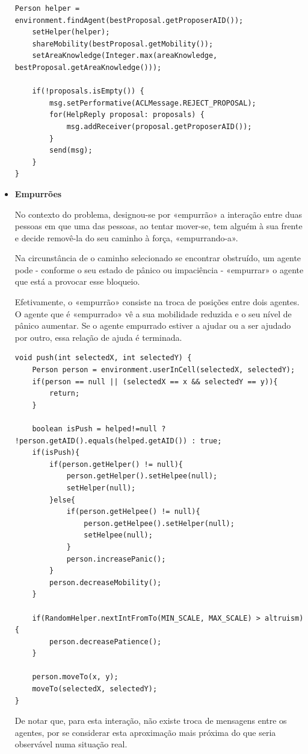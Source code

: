 \documentclass[12pt]{article}
\begin{document}
\begin{titlepage}
\begin{itemize}
\begin{lstlisting}[caption= Código \textit{Java}\ das funções responsáveis pela receção e confirmação de prospostas de ajuda.]
	Person helper = environment.findAgent(bestProposal.getProposerAID());
	setHelper(helper);
	shareMobility(bestProposal.getMobility());		
	setAreaKnowledge(Integer.max(areaKnowledge, bestProposal.getAreaKnowledge()));
	
	if(!proposals.isEmpty()) {
		msg.setPerformative(ACLMessage.REJECT_PROPOSAL);
		for(HelpReply proposal: proposals) {
			msg.addReceiver(proposal.getProposerAID());
		}
		send(msg);
	}
}
\end{lstlisting}

\item \textbf{Empurrões}

No contexto do problema, designou-se por «empurrão» a interação entre duas pessoas em que uma das pessoas, ao tentar mover-se, tem alguém à sua frente e decide removê-la do seu caminho à força, «empurrando-a».

Na circunstância de o caminho selecionado se encontrar obstruído, um agente pode - conforme o seu estado de pânico ou impaciência - «empurrar» o agente que está a provocar esse bloqueio.

Efetivamente, o «empurrão» consiste na troca de posições entre dois agentes. O agente que é «empurrado» vê a sua mobilidade reduzida e o seu nível de pânico aumentar.
Se o agente empurrado estiver a ajudar ou a ser ajudado por outro, essa relação de ajuda é terminada.

\begin{lstlisting}[caption= Código \textit{Java}\, da função que permite a uma pessoa «empurrar» outra.]
void push(int selectedX, int selectedY) {
	Person person = environment.userInCell(selectedX, selectedY);
	if(person == null || (selectedX == x && selectedY == y)){
		return;
	}
	
	boolean isPush = helped!=null ? !person.getAID().equals(helped.getAID()) : true;	
	if(isPush){
		if(person.getHelper() != null){
			person.getHelper().setHelpee(null);
			setHelper(null);
		}else{
			if(person.getHelpee() != null){
				person.getHelpee().setHelper(null);
				setHelpee(null);
			}	
			person.increasePanic();
		}	
		person.decreaseMobility();
	}			
	
	if(RandomHelper.nextIntFromTo(MIN_SCALE, MAX_SCALE) > altruism) {
		person.decreasePatience();
	}
	
	person.moveTo(x, y);
	moveTo(selectedX, selectedY);
}
\end{lstlisting}

De notar que, para esta interação, não existe troca de mensagens entre os agentes, por se considerar esta aproximação mais próxima do que seria observável numa situação real.


\end{itemize}
\end{titlepage}
\end{document}
